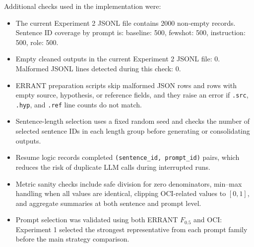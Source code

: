 Additional checks used in the implementation were:
\begin{itemize}
    \item The current Experiment 2 JSONL file contains 2000 non-empty records. Sentence ID coverage by prompt is: baseline: 500, fewshot: 500, instruction: 500, role: 500.
    \item Empty cleaned outputs in the current Experiment 2 JSONL file: 0. Malformed JSONL lines detected during this check: 0.
    \item ERRANT preparation scripts skip malformed JSON rows and rows with empty source, hypothesis, or reference fields, and they raise an error if \texttt{.src}, \texttt{.hyp}, and \texttt{.ref} line counts do not match.
    \item Sentence-length selection uses a fixed random seed and checks the number of selected sentence IDs in each length group before generating or consolidating outputs.
    \item Resume logic records completed \texttt{(sentence\_id, prompt\_id)} pairs, which reduces the risk of duplicate LLM calls during interrupted runs.
    \item Metric sanity checks include safe division for zero denominators, min--max handling when all values are identical, clipping OCI-related values to $[0,1]$, and aggregate summaries at both sentence and prompt level.
    \item Prompt selection was validated using both ERRANT $F_{0.5}$ and OCI: Experiment 1 selected the strongest representative from each prompt family before the main strategy comparison.
\end{itemize}
